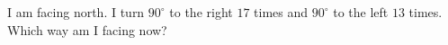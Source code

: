 I am facing north. I turn \(90^\circ\) to the right \(17\) times and \(90^\circ\) to the left \(13\) times. Which way am I facing now?
